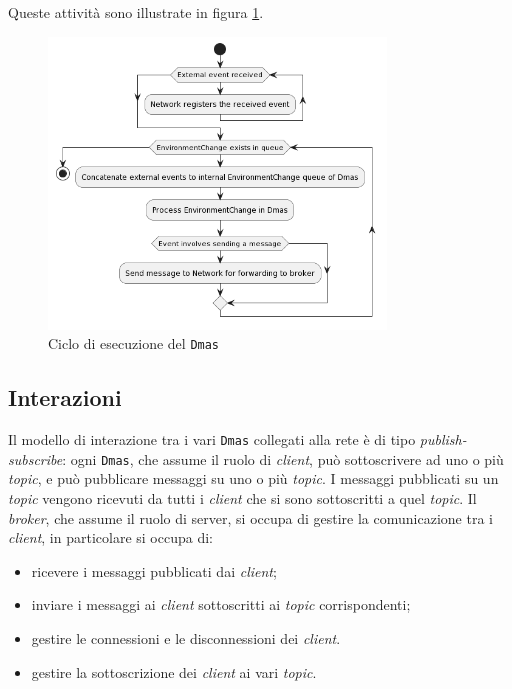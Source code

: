 Queste attività sono illustrate in figura \ref{fig:execution}.

\begin{figure}
    \centering
    \includegraphics[width=0.8\textwidth]{figures/activity-applychanges.png}
    \caption{Ciclo di esecuzione del \texttt{Dmas}}
    \label{fig:execution}
\end{figure}

\subsection{Interazioni}
Il modello di interazione tra i vari \texttt{Dmas} collegati alla rete è di tipo \textit{publish-subscribe}: ogni \texttt{Dmas}, che assume il ruolo di \textit{client}, può sottoscrivere ad uno o più \textit{topic}, e può pubblicare messaggi su uno o più \textit{topic}.
I messaggi pubblicati su un \textit{topic} vengono ricevuti da tutti i \textit{client} che si sono sottoscritti a quel \textit{topic}.
Il \textit{broker}, che assume il ruolo di server, si occupa di gestire la comunicazione tra i \textit{client}, in particolare si occupa di:
\begin{itemize}
    \item ricevere i messaggi pubblicati dai \textit{client};
    \item inviare i messaggi ai \textit{client} sottoscritti ai \textit{topic} corrispondenti;
    \item gestire le connessioni e le disconnessioni dei \textit{client}.
    \item gestire la sottoscrizione dei \textit{client} ai vari \textit{topic}.
\end{itemize}

